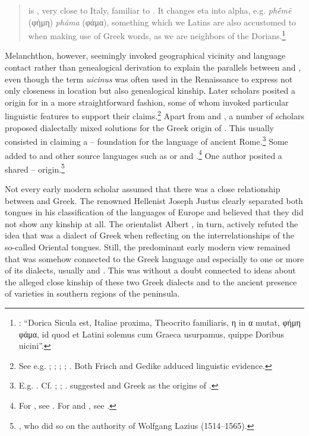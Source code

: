 \begin{quote}
 is , very close to Italy, familiar to . It changes eta into alpha, e.g. \textit{phḗmē} (φήμη) \textit{pháma} (φάμα), something which we Latins are also accustomed to when making use of Greek words, as we are neighbors of the Dorians.\footnote{\citet[a.i\textsc{\textsuperscript{v}}]{Melanchthon1518}: “Dorica Sicula est, Italiae proxima, Theocrito familiaris, η in α mutat, φήμη φάμα, id quod et Latini solemus cum Graeca usurpamus, quippe Doribus uicini”.}
\end{quote}

Melanchthon, however, seemingly invoked geographical vicinity and language contact rather than genealogical derivation to explain the parallels between  and , even though the term \textit{uicinus} was often used in the Renaissance to express not only closeness in location but also genealogical kinship. Later scholars posited a  origin for  in a more straightforward fashion, some of whom invoked particular linguistic features to support their claims.\footnote{See e.g. \citet[10]{Sylvius1531}; \citet[\textsc{i.}14]{Estienne1572}; \citet[208]{Merula1605}; \citet[1191]{[frisch]1730}; \citet[20--21]{Gedike1782}. Both Frisch and Gedike adduced linguistic evidence.} Apart from  and , a number of scholars proposed dialectally mixed solutions for the Greek origin of . This usually consisted in claiming a – foundation for the language of ancient Rome.\footnote{E.g. \citet[11--12]{Anon.1613}. Cf. \citet[304--305]{Verwey1684}; \citet[a.2\textsc{\textsuperscript{v}}, 159]{Maittaire1706}; \citet[161]{Gesner1774}. \citet[270, 379]{Casaubon1650} suggested  and  Greek as the origins of .} Some added to  and  other source languages such as  or  and .\footnote{For , see \citet[a.4\textsc{\textsuperscript{r}}]{Canini1555}. For  and , see \citet[39]{Rudiger1782}.} One author posited a shared – origin.\footnote{\citet[13]{Nicolson1715}, who did so on the authority of Wolfgang Lazius (1514–1565).}

Not every early modern scholar assumed that there was a close relationship between  and Greek. The renowned Hellenist Joseph Justus \citet{Scaliger1610} clearly separated both tongues in his classification of the languages of Europe and believed that they did not show any kinship at all. The orientalist Albert \citet[109]{Schultens1738b}, in turn, actively refuted the idea that  was a dialect of Greek when reflecting on the interrelationships of the so-called Oriental tongues. Still, the predominant early modern view remained that  was somehow connected to the Greek language and especially to one or more of its dialects, usually  and . This was without a doubt connected to ideas about the alleged close kinship of these two Greek dialects and to the ancient presence of  varieties in southern regions of the  peninsula.

